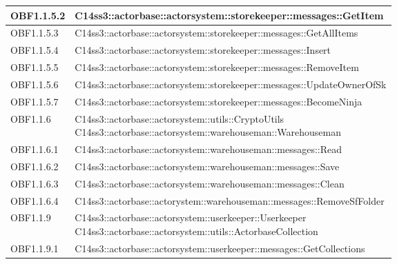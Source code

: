 \documentclass{scalatekids-article}
\begin{document}
\begin{longtable}[H]{|p{4.5cm}|p{13cm}|}
\hline
OBF1.1.5.2 & \multiLineCell[t]{C14ss3::actorbase::actorsystem::storekeeper::messages::GetItem\\}\\
\hline
OBF1.1.5.3 & \multiLineCell[t]{C14ss3::actorbase::actorsystem::storekeeper::messages::GetAllItems\\}\\
\hline
OBF1.1.5.4 & \multiLineCell[t]{C14ss3::actorbase::actorsystem::storekeeper::messages::Insert\\}\\
\hline
OBF1.1.5.5 & \multiLineCell[t]{C14ss3::actorbase::actorsystem::storekeeper::messages::RemoveItem\\}\\
\hline
OBF1.1.5.6 & \multiLineCell[t]{C14ss3::actorbase::actorsystem::storekeeper::messages::UpdateOwnerOfSk\\}\\
\hline
OBF1.1.5.7 & \multiLineCell[t]{C14ss3::actorbase::actorsystem::storekeeper::messages::BecomeNinja\\}\\
\hline
OBF1.1.6 & \multiLineCell[t]{C14ss3::actorbase::actorsystem::utils::CryptoUtils\\C14ss3::actorbase::actorsystem::warehouseman::Warehouseman\\}\\
\hline
OBF1.1.6.1 & \multiLineCell[t]{C14ss3::actorbase::actorsystem::warehouseman::messages::Read\\}\\
\hline
OBF1.1.6.2 & \multiLineCell[t]{C14ss3::actorbase::actorsystem::warehouseman::messages::Save\\}\\
\hline
OBF1.1.6.3 & \multiLineCell[t]{C14ss3::actorbase::actorsystem::warehouseman::messages::Clean\\}\\
\hline
OBF1.1.6.4 & \multiLineCell[t]{C14ss3::actorbase::actorystem::warehouseman::messages::RemoveSfFolder\\}\\
\hline
OBF1.1.9 & \multiLineCell[t]{C14ss3::actorbase::actorsystem::userkeeper::Userkeeper\\C14ss3::actorbase::actorsystem::utils::ActorbaseCollection\\}\\
\hline
OBF1.1.9.1 & \multiLineCell[t]{C14ss3::actorbase::actorsystem::userkeeper::messages::GetCollections\\}\\

\end{longtable}
\end{document}
